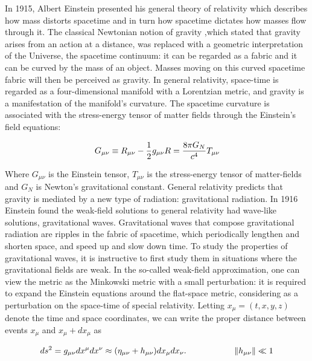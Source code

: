 \documentclass[binding=0.6cm, LaM]{sapthesis}
\begin{document}
	In 1915, Albert Einstein presented his general theory of relativity  which describes 
	how mass distorts spacetime and in turn how spacetime dictates how masses flow through it.
	The classical Newtonian notion of gravity ,which stated that gravity arises from an 
	action at a distance, was replaced with a geometric interpretation of the Universe, 
	the spacetime continuum: it can be regarded as a fabric and it can be curved 
	by the mass of an object. 
	Masses moving on this curved spacetime fabric will then be perceived as gravity.
	In general relativity, space-time is regarded as a four-dimensional manifold 
	with a Lorentzian metric, and gravity is a manifestation of the manifold’s curvature.
	The spacetime curvature is associated with the stress-energy tensor 
	of matter fields through the Einstein’s field equations:

		\begin{equation}
		G_{\mu\nu} \equiv R_{\mu\nu}  - {1 \over 2}g_{\mu\nu}R = {8\pi G_{N} \over {c^4}}T_{\mu\nu} 
		\end{equation}

	Where $G_{\mu\nu} $ is the Einstein tensor, $T_{\mu\nu} $ is the stress-energy 
	tensor of matter-fields and $ G_{N}$ is Newton’s gravitational constant.
	General relativity predicts that gravity is mediated by a new type of radiation: gravitational radiation.
	In 1916 Einstein found the weak-field solutions to general relativity had wave-like solutions, gravitational waves.
	Gravitational waves that compose gravitational radiation are ripples in the fabric of spacetime, 
	which periodically lengthen and shorten space, and speed up and slow down time.
 	To study the properties of gravitational waves, it is instructive to first study them 
	in situations where the gravitational fields are weak.
	In the so-called weak-field approximation, one can view the metric as the Minkowski metric 
	with a small perturbation: it is required to expand the Einstein equations around the flat-space metric,
	considering as a perturbation on the space-time of special relativity.
	Letting $ x_\mu = (t, x, y, z)$ denote the time and space coordinates, 
	we can write the proper distance between events $x_{\mu}$ and $x_{\mu} + dx_{\mu}$ as
		
		\[
		ds^2 = g_{\mu\nu}dx^{\mu}dx^{\nu} \approx (\eta_{\mu\nu} + h_{\mu\nu})dx_{\mu}dx_{\nu}. \hspace*{2cm}\|h_{\mu\nu}\|\ll 1
		\]
\end{document}
